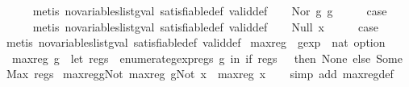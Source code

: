 \begin{isabellebody}
\ \ \ \ \isamarkupfalse%
\ {\isacharparenleft}metis\ no{\isacharunderscore}variables{\isacharunderscore}list{\isacharunderscore}gval\ satisfiable{\isacharunderscore}def\ valid{\isacharunderscore}def{\isacharparenright}\isanewline
{}\isamarkupfalse%
\isanewline
\ \ \isamarkupfalse%
\ {\isacharparenleft}Nor\ g{}\ g{}{\isacharparenright}\isanewline
\ \ \isamarkupfalse%
\ \isamarkupfalse%
\ {\isacharquery}case\isanewline
\ \ \ \ \isamarkupfalse%
\ {\isacharparenleft}metis\ no{\isacharunderscore}variables{\isacharunderscore}list{\isacharunderscore}gval\ satisfiable{\isacharunderscore}def\ valid{\isacharunderscore}def{\isacharparenright}\isanewline
{}\isamarkupfalse%
\isanewline
\ \ \isamarkupfalse%
\ {\isacharparenleft}Null\ x{\isacharparenright}\isanewline
\ \ \isamarkupfalse%
\ \isamarkupfalse%
\ {\isacharquery}case\isanewline
\ \ \ \ \isamarkupfalse%
\ {\isacharparenleft}metis\ no{\isacharunderscore}variables{\isacharunderscore}list{\isacharunderscore}gval\ satisfiable{\isacharunderscore}def\ valid{\isacharunderscore}def{\isacharparenright}\isanewline
{}\isamarkupfalse%
%
\endisatagproof
{\isafoldproof}%
%
\isadelimproof
\isanewline
%
\endisadelimproof
\isanewline
{}\isamarkupfalse%
\ max{\isacharunderscore}reg\ {\isacharcolon}{\isacharcolon}\ {\isachardoublequoteopen}gexp\ {\isasymRightarrow}\ nat\ option{\isachardoublequoteclose}\ \isanewline
\ \ {\isachardoublequoteopen}max{\isacharunderscore}reg\ g\ {\isacharequal}\ {\isacharparenleft}let\ regs\ {\isacharequal}\ {\isacharparenleft}enumerate{\isacharunderscore}gexp{\isacharunderscore}regs\ g{\isacharparenright}\ in\ if\ regs\ {\isacharequal}\ {\isacharbraceleft}{\isacharbraceright}\ then\ None\ else\ Some\ {\isacharparenleft}Max\ regs{\isacharparenright}{\isacharparenright}{\isachardoublequoteclose}\isanewline
\isanewline
{}\isamarkupfalse%
\ max{\isacharunderscore}reg{\isacharunderscore}gNot{\isacharcolon}\ {\isachardoublequoteopen}max{\isacharunderscore}reg\ {\isacharparenleft}gNot\ x{\isacharparenright}\ {\isacharequal}\ max{\isacharunderscore}reg\ x{\isachardoublequoteclose}\isanewline
%
\isadelimproof
\ \ %
\endisadelimproof
%
\isatagproof
{}\isamarkupfalse%
\ {\isacharparenleft}simp\ add{\isacharcolon}\ max{\isacharunderscore}reg{\isacharunderscore}def{\isacharparenright}%
\endisatagproof
{\isafoldproof}%
%
\isadelimproof

\end{isabellebody}
